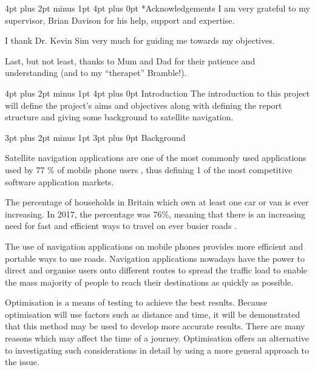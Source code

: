 \documentclass[12pt,a4paper]{article}
\makeatletter
\renewcommand\subsection{\@startsection {subsection}{1}{0mm} %
                               {3pt plus 2pt minus 1pt} %
                               {3pt plus 0pt} %
                               {\normalfont\bfseries}}
\renewcommand\section{\@startsection {section}{1}{0mm} %
                               {4pt plus 2pt minus 1pt} %
                               {4pt plus 0pt} %
                               {\Large\bfseries}}
\makeatother
\begin{document}
\newpage

\section*{Acknowledgements}
	I am very grateful to my supervisor, Brian Davison for his help, support and expertise. 
	
	I thank Dr. Kevin Sim very much for guiding me towards my objectives.
	
	Last, but not least, thanks to Mum and Dad for their patience and understanding (and to my \enquote{therapet} Bramble!).
\newpage


\section{Introduction}
The introduction to this project will define the project's aims and objectives along with defining the report structure and giving some background to satellite navigation.


\subsection{Background}

Satellite navigation applications are one of the most commonly used applications used by 77 \% of mobile phone users \cite{trendsInnavigation}, thus defining 1 of the most competitive software application markets.

The percentage of households in Britain which own at least one car or van is ever increasing. In 2017, the percentage was 76\%, meaning that there is an increasing need for fast and efficient ways to travel on ever busier roads \cite{nationalSurvey}.

The use of navigation applications on mobile phones provides more efficient and portable ways to use roads. Navigation applications nowadays have the power to direct and organise users onto different routes to spread the traffic load to enable the mass majority of people to reach their destinations as quickly as possible.

Optimisation is a means of testing to achieve the best results.
Because optimisation will use factors such as distance and time, it will be demonstrated that this method may be used to develop more accurate results. There are many reasons which may affect the time of a journey. Optimisation offers an alternative to investigating such considerations in detail by using a more general approach to the issue.
\end{document}
